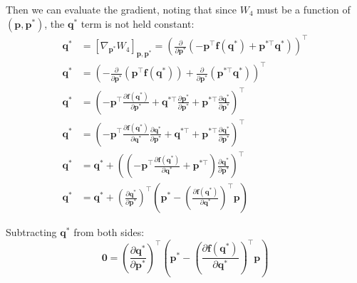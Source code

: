 \documentclass[titlepage]{article}
\begin{document}
Then we can evaluate the gradient, noting that since $W_4$ must be a function of $(\boldsymbol{p},\boldsymbol{p}^*)$, the $\boldsymbol{q}^*$ term is not held constant:
\begin{equation}
	\begin{split}
		\boldsymbol{q}^*&=\left[\nabla_{\boldsymbol{p}^*}W_4\right]_{\boldsymbol{p},\boldsymbol{p}^*}=\left(\frac{\partial}{\partial\boldsymbol{p}^*}\left(-\boldsymbol{p}^\top\boldsymbol{f}(\boldsymbol{q}^*)+\boldsymbol{p}^{*\top}\boldsymbol{q}^*\right)\right)^\top \\
		\boldsymbol{q}^*&=\left(-\frac{\partial}{\partial\boldsymbol{p}^*}\left(\boldsymbol{p}^\top\boldsymbol{f}(\boldsymbol{q}^*)\right)+\frac{\partial}{\partial\boldsymbol{p}^*}\left(\boldsymbol{p}^{*\top}\boldsymbol{q}^*\right)\right)^\top \\
		\boldsymbol{q}^*&=\left(-\boldsymbol{p}^\top\frac{\partial\boldsymbol{f}(\boldsymbol{q}^*)}{\partial\boldsymbol{p}^*}+\boldsymbol{q}^{*\top}\frac{\partial\boldsymbol{p}^*}{\partial\boldsymbol{p}^*}+\boldsymbol{p}^{*\top}\frac{\partial\boldsymbol{q}^*}{\partial\boldsymbol{p}^*}\right)^\top \\
		\boldsymbol{q}^*&=\left(-\boldsymbol{p}^\top\frac{\partial\boldsymbol{f}(\boldsymbol{q}^*)}{\partial\boldsymbol{q}^*}\frac{\partial\boldsymbol{q}^*}{\partial\boldsymbol{p}^*}+\boldsymbol{q}^{*\top}+\boldsymbol{p}^{*\top}\frac{\partial\boldsymbol{q}^*}{\partial\boldsymbol{p}^*}\right)^\top \\
		\boldsymbol{q}^*&=\boldsymbol{q}^*+\left(\left(-\boldsymbol{p}^\top\frac{\partial\boldsymbol{f}(\boldsymbol{q}^*)}{\partial\boldsymbol{q}^*}+\boldsymbol{p}^{*\top}\right)\frac{\partial\boldsymbol{q}^*}{\partial\boldsymbol{p}^*}\right)^\top \\
		\boldsymbol{q}^*&=\boldsymbol{q}^*+\left(\frac{\partial\boldsymbol{q}^*}{\partial\boldsymbol{p}^*}\right)^\top\left(\boldsymbol{p}^*-\left(\frac{\partial\boldsymbol{f}(\boldsymbol{q}^*)}{\partial\boldsymbol{q}^*}\right)^\top\boldsymbol{p}\right)
	\end{split}
\end{equation}

Subtracting $\boldsymbol{q}^*$ from both sides:
\begin{equation}
	\boldsymbol{0}=\left(\frac{\partial\boldsymbol{q}^*}{\partial\boldsymbol{p}^*}\right)^\top\left(\boldsymbol{p}^*-\left(\frac{\partial\boldsymbol{f}(\boldsymbol{q}^*)}{\partial\boldsymbol{q}^*}\right)^\top\boldsymbol{p}\right)
\end{equation}
\end{document}
